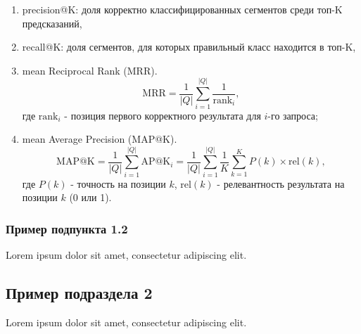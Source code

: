 \begin{enumerate}
    \item precision@K: доля корректно классифицированных сегментов среди топ-K предсказаний,

    \item recall@K: доля сегментов, для которых правильный класс находится в топ-K,

    \item mean Reciprocal Rank (MRR).
    \begin{equation}
    \text{MRR} = \frac{1}{|Q|} \sum_{i=1}^{|Q|} \frac{1}{\text{rank}_i},
    \end{equation}
    \noindent где $\text{rank}_i$ - позиция первого корректного результата для $i$-го запроса;

    \item mean Average Precision (MAP@K).
    \begin{equation}
    \text{MAP@K} = \frac{1}{|Q|} \sum_{i=1}^{|Q|} \text{AP@K}_i = \frac{1}{|Q|} \sum_{i=1}^{|Q|} \frac{1}{K} \sum_{k=1}^{K} P(k) \times \text{rel}(k),
    \end{equation}
    \noindent где $P(k)$ - точность на позиции $k$, $\text{rel}(k)$ - релевантность результата на позиции $k$ (0 или 1).
\end{enumerate}

\subsubsection{Пример подпункта 1.2}

Lorem ipsum dolor sit amet, consectetur adipiscing elit.

\subsection{Пример подраздела 2}

Lorem ipsum dolor sit amet, consectetur adipiscing elit.
